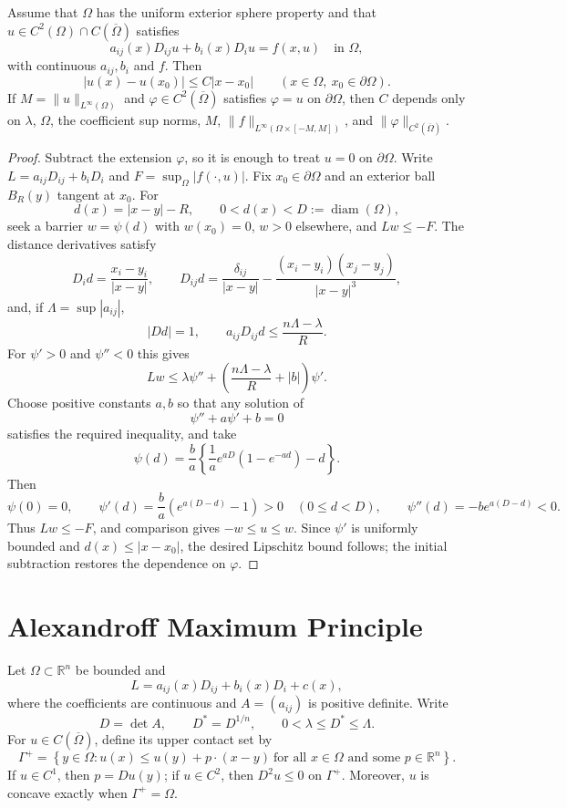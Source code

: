 \begin{proposition}\label{hanlin:maxprin-prop-2-29}
Assume that $\Omega$ has the uniform exterior sphere property and that
$u\in C^2(\Omega)\cap C(\overline\Omega)$ satisfies
\[
a_{ij}(x)D_{ij}u+b_i(x)D_iu=f(x,u)
\quad\text{in }\Omega,
\]
with continuous $a_{ij},b_i$ and $f$. Then
\[
|u(x)-u(x_0)|\le C|x-x_0|
\qquad(x\in\Omega,\ x_0\in\partial\Omega).
\]
If $M=\|u\|_{L^\infty(\Omega)}$ and
$\varphi\in C^2(\overline\Omega)$ satisfies $\varphi=u$ on $\partial\Omega$,
then $C$ depends only on $\lambda$, $\Omega$, the coefficient sup norms, $M$,
$\|f\|_{L^\infty(\Omega\times[-M,M])}$, and
$\|\varphi\|_{C^2(\overline\Omega)}$.
\end{proposition}
\begin{proof}
\sketch Subtract the extension $\varphi$, so it is enough to treat $u=0$ on
$\partial\Omega$. Write $L=a_{ij}D_{ij}+b_iD_i$ and
$F=\sup_\Omega|f(\cdot,u)|$. Fix $x_0\in\partial\Omega$ and an exterior ball
$B_R(y)$ tangent at $x_0$. For
\[
d(x)=|x-y|-R,
\qquad 0<d(x)<D:=\operatorname{diam}(\Omega),
\]
seek a barrier $w=\psi(d)$ with $w(x_0)=0$, $w>0$ elsewhere, and $Lw\le-F$.
The distance derivatives satisfy
\[
D_id=\frac{x_i-y_i}{|x-y|},
\qquad
D_{ij}d=\frac{\delta_{ij}}{|x-y|}
-\frac{(x_i-y_i)(x_j-y_j)}{|x-y|^3},
\]
and, if $\Lambda=\sup|a_{ij}|$,
\[
|Dd|=1,
\qquad
a_{ij}D_{ij}d\le\frac{n\Lambda-\lambda}{R}.
\]
For $\psi'>0$ and $\psi''<0$ this gives
\[
Lw\le\lambda\psi''
+\left(\frac{n\Lambda-\lambda}{R}+|b|\right)\psi'.
\]
Choose positive constants $a,b$ so that any solution of
\[
\psi''+a\psi'+b=0
\]
satisfies the required inequality, and take
\[
\psi(d)=\frac ba\left\{\frac1a e^{aD}(1-e^{-ad})-d\right\}.
\]
Then
\[
\psi(0)=0,
\qquad
\psi'(d)=\frac ba(e^{a(D-d)}-1)>0\quad(0\le d<D),
\qquad
\psi''(d)=-be^{a(D-d)}<0.
\]
Thus $Lw\le-F$, and comparison gives $-w\le u\le w$. Since $\psi'$ is
uniformly bounded and $d(x)\le|x-x_0|$, the desired Lipschitz bound follows;
the initial subtraction restores the dependence on $\varphi$.
\end{proof}

\section{Alexandroff Maximum Principle}\label{hanlin:maxprin-section-2-5}

Let $\Omega\subset\mathbb R^n$ be bounded and
\[
L=a_{ij}(x)D_{ij}+b_i(x)D_i+c(x),
\]
where the coefficients are continuous and $A=(a_{ij})$ is positive definite.
Write
\[
D=\det A,
\qquad
D^*=D^{1/n},
\qquad
0<\lambda\le D^*\le\Lambda.
\]
For $u\in C(\overline\Omega)$, define its upper contact set by
\[
\Gamma^+=\left\{y\in\Omega:
u(x)\le u(y)+p\cdot(x-y)\ \text{for all }x\in\Omega
\text{ and some }p\in\mathbb R^n\right\}.
\]
If $u\in C^1$, then $p=Du(y)$; if $u\in C^2$, then $D^2u\le0$ on
$\Gamma^+$. Moreover, $u$ is concave exactly when $\Gamma^+=\Omega$.

